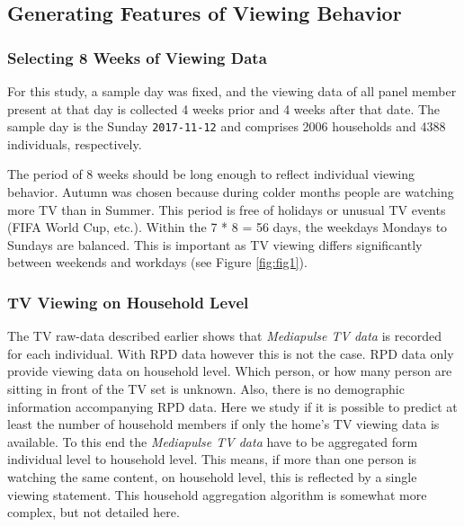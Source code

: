\documentclass[]{article}
\begin{document}
\hypertarget{generating-features-of-viewing-behavior}{%
\subsection{Generating Features of Viewing
Behavior}\label{generating-features-of-viewing-behavior}}

\hypertarget{selecting-8-weeks-of-viewing-data}{%
\subsubsection{Selecting 8 Weeks of Viewing
Data}\label{selecting-8-weeks-of-viewing-data}}

For this study, a sample day was fixed, and the viewing data of all
panel member present at that day is collected 4 weeks prior and 4 weeks
after that date. The sample day is the Sunday \texttt{2017-11-12} and
comprises 2006 households and 4388 individuals, respectively.

The period of 8 weeks should be long enough to reflect individual
viewing behavior. Autumn was chosen because during colder months people
are watching more TV than in Summer. This period is free of holidays or
unusual TV events (FIFA World Cup, etc.). Within the 7 * 8 = 56 days,
the weekdays Mondays to Sundays are balanced. This is important as TV
viewing differs significantly between weekends and workdays (see Figure
\ref{fig:fig1}).

\hypertarget{tv-viewing-on-household-level}{%
\subsubsection{TV Viewing on Household
Level}\label{tv-viewing-on-household-level}}

The TV raw-data described earlier shows that \emph{Mediapulse TV data}
is recorded for each individual. With RPD data however this is not the
case. RPD data only provide viewing data on household level. Which
person, or how many person are sitting in front of the TV set is
unknown. Also, there is no demographic information accompanying RPD
data. Here we study if it is possible to predict at least the number of
household members if only the home's TV viewing data is available. To
this end the \emph{Mediapulse TV data} have to be aggregated form
individual level to household level. This means, if more than one person
is watching the same content, on household level, this is reflected by a
single viewing statement. This household aggregation algorithm is
somewhat more complex, but not detailed here.
\end{document}
